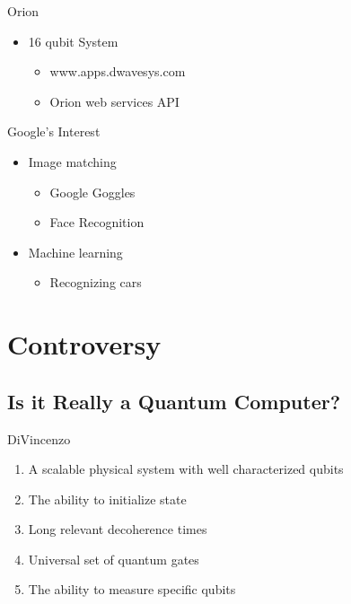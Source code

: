 \documentclass{beamer}
\begin{document}
\begin{frame}{Orion}
\begin{itemize}
  \item 16 qubit System
  \begin{itemize}
   \item www.apps.dwavesys.com
   \item Orion web services API
  \end{itemize}

 \end{itemize}

\end{frame}

\begin{frame}{Google's Interest}
 \begin{itemize}
  \item Image matching
  \begin{itemize}
   \item Google Goggles
   \item Face Recognition
  \end{itemize}
  \item Machine learning
  \begin{itemize}
   \item Recognizing cars
  \end{itemize}

 \end{itemize}

\end{frame}

\section{Controversy}

\subsection{Is it Really a Quantum Computer?}

\begin{frame}{DiVincenzo}
 \begin{enumerate}
  \item A scalable physical system with well characterized qubits
  \pause
  \item The ability to initialize state
  \pause
  \item Long relevant decoherence times
  \pause
  \item Universal set of quantum gates
  \pause
  \item The ability to measure specific qubits
 \end{enumerate}

\end{frame}
\end{document}

